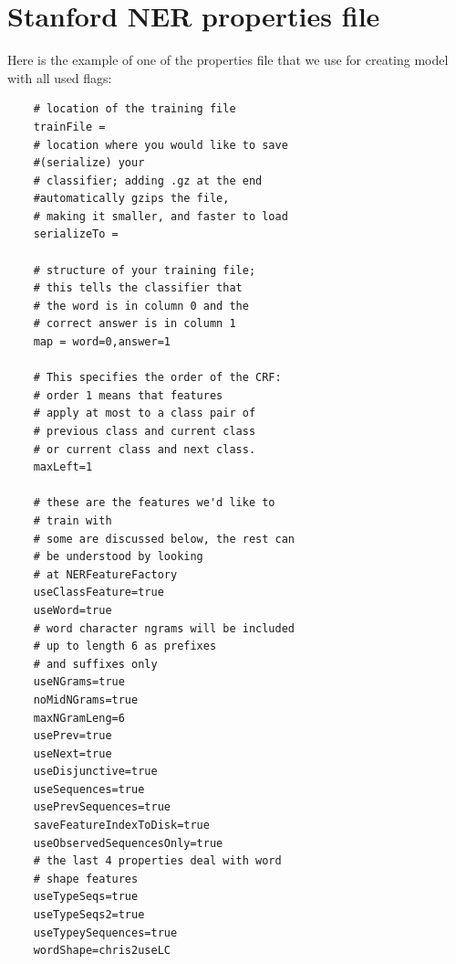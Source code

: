 \documentclass[thesis=M,english]{FITthesis}[2018/05/30]
\begin{document}
\chapter{Stanford NER properties file}\label{NERpropertiesFile}
Here is the example of one of the properties file that we use for creating model with all used flags:
\begin{lstlisting}
	# location of the training file
	trainFile = 
	# location where you would like to save 
	#(serialize) your
	# classifier; adding .gz at the end 
	#automatically gzips the file,
	# making it smaller, and faster to load
	serializeTo = 

	# structure of your training file; 
	# this tells the classifier that
	# the word is in column 0 and the
	# correct answer is in column 1
	map = word=0,answer=1

	# This specifies the order of the CRF:
	# order 1 means that features
	# apply at most to a class pair of 
	# previous class and current class
	# or current class and next class.
	maxLeft=1

	# these are the features we'd like to 
	# train with
	# some are discussed below, the rest can 
	# be understood by looking 
	# at NERFeatureFactory
	useClassFeature=true
	useWord=true
	# word character ngrams will be included 
	# up to length 6 as prefixes
	# and suffixes only 
	useNGrams=true
	noMidNGrams=true
	maxNGramLeng=6
	usePrev=true
	useNext=true
	useDisjunctive=true
	useSequences=true
	usePrevSequences=true
	saveFeatureIndexToDisk=true
	useObservedSequencesOnly=true
	# the last 4 properties deal with word 
	# shape features
	useTypeSeqs=true
	useTypeSeqs2=true
	useTypeySequences=true
	wordShape=chris2useLC
\end{lstlisting}
\end{document}
